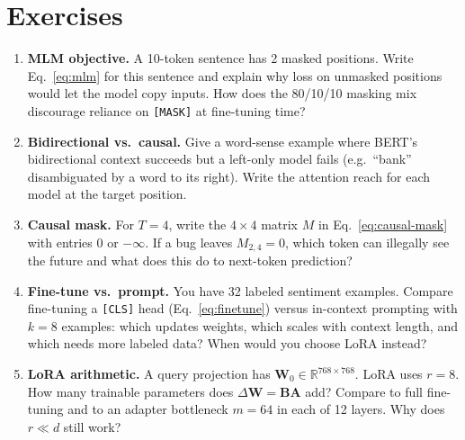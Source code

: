 \section{Exercises}
\label{sec:ch07-exercises}
\begin{enumerate}[label=E7.\arabic*, leftmargin=*, itemsep=0.7em]
    \item \textbf{MLM objective.} A 10-token sentence has 2 masked positions. Write Eq.~\eqref{eq:mlm} for this sentence and explain why loss on unmasked positions would let the model copy inputs. How does the 80/10/10 masking mix discourage reliance on \texttt{[MASK]} at fine-tuning time?
    \item \textbf{Bidirectional vs.\ causal.} Give a word-sense example where BERT's bidirectional context succeeds but a left-only model fails (e.g.\ ``bank'' disambiguated by a word to its right). Write the attention reach for each model at the target position.
    \item \textbf{Causal mask.} For $T=4$, write the $4\times4$ matrix $M$ in Eq.~\eqref{eq:causal-mask} with entries $0$ or $-\infty$. If a bug leaves $M_{2,4}=0$, which token can illegally see the future and what does this do to next-token prediction?
    \item \textbf{Fine-tune vs.\ prompt.} You have 32 labeled sentiment examples. Compare fine-tuning a \texttt{[CLS]} head (Eq.~\eqref{eq:finetune}) versus in-context prompting with $k=8$ examples: which updates weights, which scales with context length, and which needs more labeled data? When would you choose LoRA instead?
    \item \textbf{LoRA arithmetic.} A query projection has $\mathbf{W}_0\in\mathbb{R}^{768\times768}$. LoRA uses $r=8$. How many trainable parameters does $\Delta\mathbf{W}=\mathbf{B}\mathbf{A}$ add? Compare to full fine-tuning and to an adapter bottleneck $m=64$ in each of 12 layers. Why does $r\ll d$ still work?
\end{enumerate}
